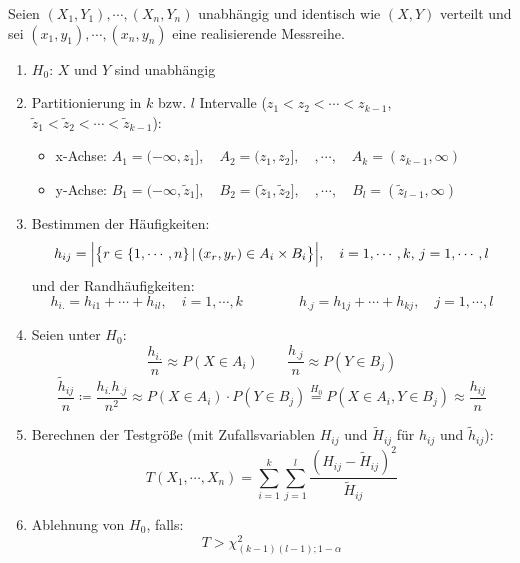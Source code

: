 			Seien \( (X_1, Y_1), \cdots, (X_n, Y_n) \) unabhängig und identisch wie \( (X, Y) \) verteilt und sei \( (x_1, y_1), \cdots, (x_n, y_n) \) eine realisierende Messreihe.
			\begin{enumerate}
				\item \(H_0\): \quad \(X\) und \(Y\) sind unabhängig
				\item Partitionierung in \(k\) bzw. \(l\) Intervalle (\( z_1 < z_2 < \cdots < z_{k-1} \), \( \tilde{z}_1 < \tilde{z}_2 < \cdots < \tilde{z}_{k-1} \)):
					\begin{itemize}
						\item x-Achse: \( A_1 = (-\infty, z_1], \quad A_2 = (z_1, z_2], \quad, \cdots, \quad A_k = (z_{k-1}, \infty) \)
						\item y-Achse: \( B_1 = (-\infty, \tilde{z}_1], \quad B_2 = (\tilde{z}_1, \tilde{z}_2], \quad, \cdots, \quad B_l = (\tilde{z}_{l-1}, \infty) \)
					\end{itemize}
				\item Bestimmen der Häufigkeiten:
					\begin{equation*}
						h_{ij} = \Big| \big\{ r \in \{ 1, \cdots, n \} \,\vert\, (x_r, y_r) \in A_i \times B_i \big\} \Big|, \quad i = 1, \cdots, k,\, j = 1, \cdots, l
					\end{equation*}
					und der Randhäufigkeiten:
					\begin{equation*}
						h_{i.} = h_{i1} + \cdots + h_{il}, \quad i = 1, \cdots, k \qquad\qquad h_{.j} = h_{1j} + \cdots + h_{kj}, \quad j = 1, \cdots, l
					\end{equation*}
				\item Seien unter \(H_0\):
					\begin{equation*}
						\frac{h_{i.}}{n} \approx P(X \in A_i) \qquad \frac{h_{.j}}{n} \approx P(Y \in B_j)
					\end{equation*}
					\begin{equation*}
						\frac{\tilde{h}_{ij}}{n} \coloneqq \frac{h_{i.} h_{.j}}{n^2} \approx P(X \in A_i) \cdot P(Y \in B_j) \overset{H_0}{=} P(X \in A_i, Y \in B_j) \approx \frac{h_{ij}}{n}
					\end{equation*}
				\item Berechnen der Testgröße (mit Zufallsvariablen \( H_{ij} \) und \( \tilde{H}_{ij} \) für \( h_{ij} \) und \( \tilde{h}_{ij} \)):
					\begin{equation*}
						T(X_1, \cdots, X_n) = \sum_{i = 1}^{k} \sum_{j = 1}^{l} \frac{(H_{ij} - \tilde{H}_{ij})^2}{\tilde{H}_{ij}}
					\end{equation*}
				\item Ablehnung von \(H_0\), falls:
					\begin{equation*}
						T > \chi_{(k - 1)(l - 1); 1 - \alpha}^2
					\end{equation*}
			\end{enumerate}


